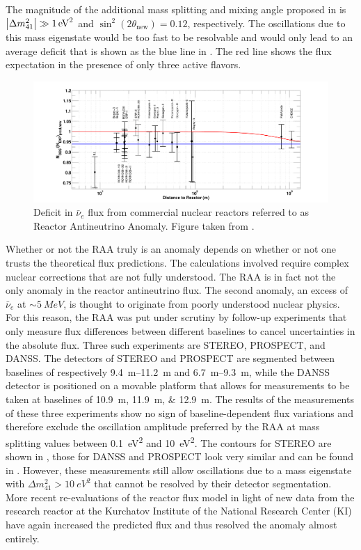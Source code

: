 The magnitude of the additional mass splitting and mixing angle proposed in \cite{Mention:2011rk} is $\abs{\Delta m^2_{41}} \gg \SI{1}{eV^2}$ and $\sin^2(2\theta_\mathrm{new})=0.12$, respectively.
The oscillations due to this mass eigenstate would be too fast to be resolvable and would only lead to an average deficit that is shown as the blue line in .
The red line shows the flux expectation in the presence of only three active flavors.
\begin{figure}
    \centering
    \includegraphics{figures/theory/raa.pdf}
    \caption{Deficit in $\bar{\nu}_e$ flux from commercial nuclear reactors referred to as Reactor Antineutrino Anomaly. Figure taken from \cite{Mention:2011rk}.\label{fig:raa}}
\end{figure}

Whether or not the RAA truly is an anomaly depends on whether or not one trusts the theoretical flux predictions.
The calculations involved require complex nuclear corrections that are not fully understood.
The RAA is in fact not the only anomaly in the reactor antineutrino flux.
The second anomaly, an excess of $\bar{\nu}_e$ at $\sim \SI{5}{MeV}$, is thought to originate from poorly understood nuclear physics\cite{HUBER2016268}.
For this reason, the RAA was put under scrutiny by follow-up experiments that only measure flux differences between different baselines to cancel uncertainties in the absolute flux.
Three such experiments are STEREO, PROSPECT, and DANSS.
The detectors of STEREO and PROSPECT are segmented between baselines of respectively \SIrange{9.4}{11.2}{m} and \SIrange{6.7}{9.3}{m}, while the DANSS detector is positioned on a movable platform that allows for measurements to be taken at baselines of \SIlist{10.9;11.9;12.9}{m}.
The results of the measurements of these three experiments show no sign of baseline-dependent flux variations and therefore exclude the oscillation amplitude preferred by the RAA at mass splitting values between \SI{0.1}{eV^2} and \SI{10}{eV^2}.
The contours for \textsc{STEREO} are shown in , those for \textsc{DANSS} and \textsc{PROSPECT} look very similar and can be found in \cite{Licciardi:2021hyi}.
However, these measurements still allow oscillations due to a mass eigenstate with $\Delta m^2_{41}> \SI{10}{eV^2}$ that cannot be resolved by their detector segmentation.
More recent re-evaluations of the reactor flux model in light of new data from the research reactor at the Kurchatov Institute of the National Research Center (KI) have again increased the predicted flux and thus resolved the anomaly almost entirely.


